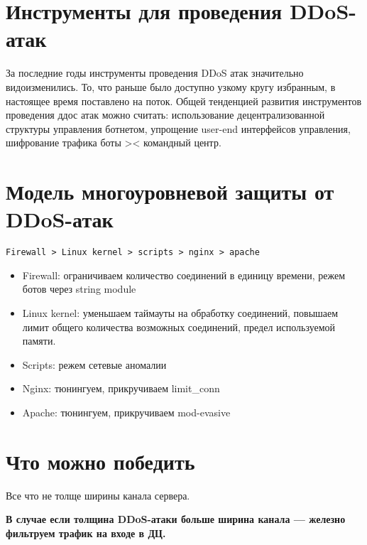 \documentclass[10pt, a5paper]{article}
\begin{document}
\section*{Инструменты для проведения DDoS-атак}
За последние годы инструменты проведения DDoS атак значительно видоизменились. То, что раньше было доступно узкому кругу избранным, в настоящее время поставлено на поток. Общей  тенденцией развития инструментов проведения ддос атак можно считать: использование децентрализованной структуры управления ботнетом, упрощение user-end интерфейсов управления, шифрование трафика боты >< командный центр.

\section*{Модель многоуровневой защиты от DDoS-атак}
\verb!Firewall > Linux kernel > scripts > nginx > apache!
\begin{itemize}
\item Firewall: ограничиваем количество соединений в единицу времени, режем ботов через  string module
\item Linux kernel: уменьшаем таймауты на обработку соединений, повышаем лимит общего количества возможных соединений, предел используемой памяти.
\item Scripts: режем сетевые аномалии
\item Nginx: тюнингуем, прикручиваем  limit\_conn
\item Apache: тюнингуем, прикручиваем mod-evasive
\end{itemize}

\section*{Что можно победить}
Все что не толще ширины канала сервера.

\bf{В случае если толщина DDoS-атаки больше ширина канала --- железно фильтруем трафик на входе в ДЦ.}
\end{document}
